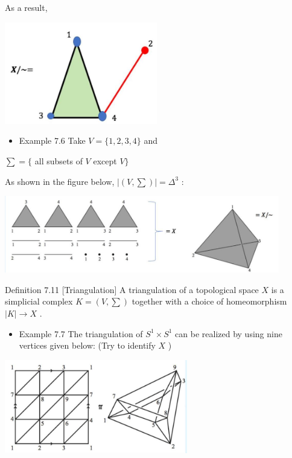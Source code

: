 As a result,

\begin{center}
\includegraphics[max width=0.5\textwidth]{images/bo_d2bcsrref24c73avs720_75_669_1355_598_399_0.jpg}
\end{center}
\hspace*{3em} 

\begin{itemize}
\item Example 7.6 Take \(V = \{ 1,2,3,4\}\) and
\end{itemize}

\(\sum  = \{\) all subsets of \(V\) except \(V\}\)

As shown in the figure below, \(\left| \left( {V,\sum }\right) \right|  = {\Delta }^{3}\) :

\begin{center}
\includegraphics[max width=0.9\textwidth]{images/bo_d2bcsrref24c73avs720_76_274_640_1082_304_0.jpg}
\end{center}
\hspace*{3em} 

Definition 7.11 [Triangulation] A triangulation of a topological space \(X\) is a simplicial complex \(K = \left( {V,\sum }\right)\) together with a choice of homeomorphism \(\left| K\right|  \rightarrow  X\) .

\begin{itemize}
\item Example 7.7 The triangulation of \({S}^{1} \times  {S}^{1}\) can be realized by using nine vertices given below: (Try to identify \(X\) )
\end{itemize}

\begin{center}
\includegraphics[max width=0.6\textwidth]{images/bo_d2bcsrref24c73avs720_76_468_1487_761_388_0.jpg}
\end{center}
\hspace*{3em} 

